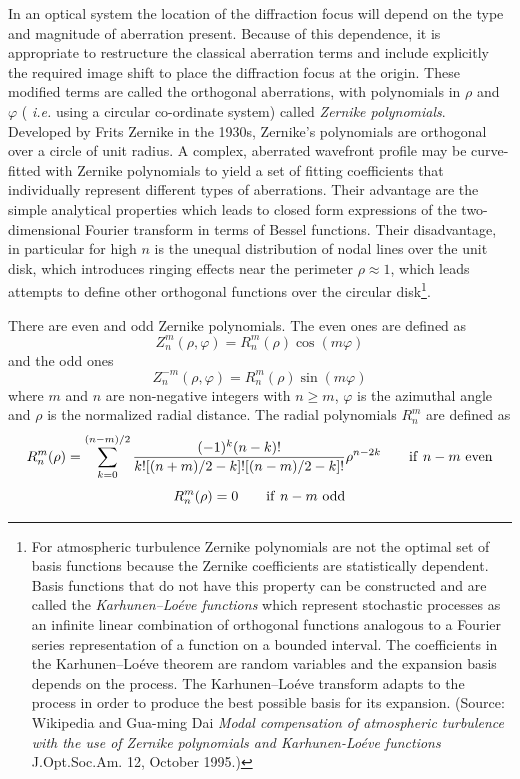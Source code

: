 In an optical system the location of the diffraction focus will depend
on the type and magnitude of aberration present. Because of this
dependence, it is appropriate to restructure the classical aberration
terms and include explicitly the required image shift to place the
diffraction focus at the origin. These modified terms are called the
orthogonal aberrations, with polynomials in $\rho$ and $\varphi$ ({\it
  i.e.} using a circular co-ordinate system) called
{\it Zernike polynomials}. Developed by Frits Zernike in the 1930s,
 Zernike's polynomials are orthogonal over a circle of unit radius. A complex, 
aberrated wavefront profile may be curve-fitted with Zernike polynomials to 
yield a set of fitting coefficients that individually represent different 
types of aberrations. Their advantage are the simple analytical
properties which leads to closed form expressions of the
two-dimensional Fourier transform in terms of Bessel functions. 
Their disadvantage, in particular for high $n$ is the unequal
distribution of nodal lines over the unit disk, which introduces
ringing effects near the perimeter $\rho\approx 1$, which leads
attempts to define other orthogonal functions over the circular 
disk\footnote{For atmospheric turbulence
  Zernike polynomials are not the optimal set of basis functions
  because the Zernike coefficients are statistically dependent. Basis
  functions that do not have this property can be constructed and are
  called the {\it Karhunen--Lo{\'e}ve functions} which represent
stochastic processes as an infinite linear combination of orthogonal
functions analogous to a Fourier series representation of a function
on a bounded interval. The coefficients in the Karhunen--Lo{\'e}ve
theorem are random variables and the expansion basis depends on the
process. The Karhunen--Lo{\'e}ve transform adapts to the process in 
order to produce the best possible basis for its expansion. (Source: 
Wikipedia and Gua-ming Dai {\it Modal compensation of atmospheric
  turbulence with the use of Zernike polynomials and
  Karhunen-Lo{\'e}ve functions} J.Opt.Soc.Am. 12, October 1995.)}.

There are even and odd Zernike polynomials. The even ones are defined as
\[
Z_n^m(\rho,\varphi)=R_n^m(\rho)\cos(m\varphi)
\]
and the odd ones
\[
Z_n^{-m}(\rho,\varphi)=R_n^m(\rho)\sin(m\varphi)
\]
where $m$ and $n$ are non-negative integers with $n\ge m$, $\varphi$ is the
azimuthal angle and $\rho$ is the normalized radial distance. The radial 
polynomials $R_n^m$ are defined as
\[
R_n^m(\rho)=\sum_{k=0}^{(n-m)/2}{(-1)^k(n-k)!\over 
   k![{(n+m)/2}-k]![{(n-m)/2}-k]!}\rho^{n-2k}\qquad{\rm if}~n-m~{\rm even}
\]
\[
R_n^m(\rho)=0\qquad{\rm if}~n-m~{\rm odd}
\]

